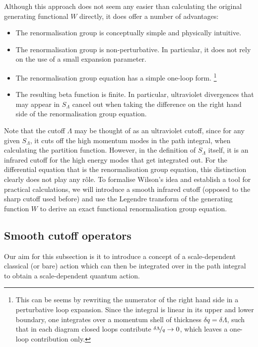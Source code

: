 \documentclass[11pt]{book}
\newcommand{\SLambda}{ S_{\scriptscriptstyle{\Lambda}} }
\numberwithin{equation}{chapter}
\begin{document}
Although this approach does not seem any easier than calculating
the original generating functional $W$ directly, it does
offer a number of advantages:
\bigskip
\begin{itemize}
  \setlength\itemsep{1.2mm}
  \item
    The renormalisation group is conceptually simple and physically intuitive.
  \item
    The renormalisation group is non-perturbative.
    In particular, it does not rely on the use of a small expansion parameter.
  \item
    The renormalisation group equation has a simple one-loop form.%
    \footnote{
      This can be seems by rewriting the numerator of the right hand side
      in a perturbative loop expansion. Since the integral is linear
      in its upper and lower boundary, one integrates over a momentum
      shell of thickness $\delta q = \delta \Lambda$,
      such that in each diagram closed loops contribute
      $\nicefrac{\delta \Lambda}{q} \rightarrow 0$, which
      leaves a one-loop contribution only.
    }
  \item
    The resulting beta function is finite.
    In particular, ultraviolet divergences
    that may appear in $\SLambda$ cancel out when taking the difference
    on the right hand side of the renormalisation group equation.
\end{itemize}
\bigskip
Note that the cutoff $\Lambda$ may be thought of as an ultraviolet cutoff,
since for any given $\SLambda$, it cuts off the high momentum modes in
the path integral, when calculating the partition function.
However, in the definition of $\SLambda$ itself, it is an infrared cutoff
for the high energy modes that get integrated out. For the differential
equation that is the renormalisation group equation, this distinction
clearly does not play any r\^ole. To formalise Wilson's idea and
establish a tool for practical calculations, we will introduce
a smooth infrared cutoff (opposed to the sharp cutoff used before)
and use the Legendre transform of the generating function $W$ to
derive an exact functional renormalisation group equation.


\subsection{Smooth cutoff operators}

Our aim for this subsection is it to introduce a concept of a scale-dependent
classical (or bare) action which can then be integrated over in the path
integral to obtain a scale-dependent quantum action.
\end{document}

